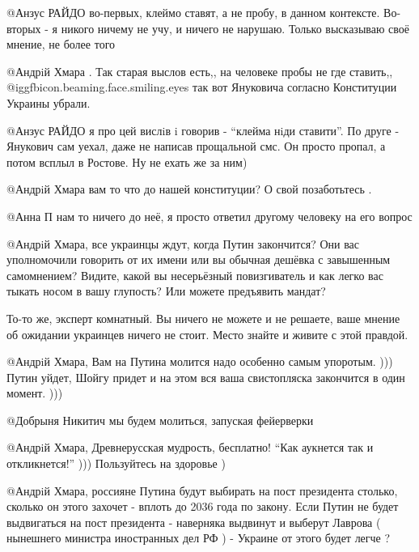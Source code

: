 \begin{itemize}
\begin{itemize}

@Анзус РАЙДО  во-первых, клеймо ставят, а не пробу, в данном контексте.
Во-вторых - я никого ничему не учу, и ничего не нарушаю. Только высказываю
своё мнение, не более того


@Андрiй Хмара . Так старая выслов есть,, на человеке пробы не где ставить,,  @igg{fbicon.beaming.face.smiling.eyes} 
так вот Януковича согласно Конституции Украины убрали.


@Анзус РАЙДО  я про цей вислiв i говорив - \enquote{клейма нiди ставити}. По друге -
Янукович сам уехал, даже не написав прощальной смс. Он просто пропал, а потом
всплыл в Ростове. Ну не ехать же за ним)


@Андрiй Хмара  вам то  что до нашей конституции? О свой позаботьтесь .



@Анна П  нам то ничего до неё, я просто ответил другому человеку на его вопрос


@Андрiй Хмара, все украинцы ждут, когда Путин закончится? Они вас
уполномочили говорить от их имени или вы обычная дешёвка с завышенным
самомнением? Видите, какой вы несерьёзный повизгиватель и как легко вас тыкать
носом в вашу глупость? Или можете предъявить мандат? 

То-то же, эксперт комнатный. Вы ничего не можете и не решаете, ваше мнение об
ожидании украинцев ничего не стоит. Место знайте и живите с этой правдой.


@Андрiй Хмара, Вам на Путина молится надо особенно самым упоротым. ))) Путин
уйдет, Шойгу придет и на этом вся ваша свистопляска закончится в один момент.
)))


@Добрыня Никитич  мы будем молиться, запуская фейерверки


@Андрiй Хмара, Древнерусская мудрость, бесплатно! \enquote{Как аукнется так и
откликнется!} ))) Пользуйтесь на здоровье )


@Андрiй Хмара, россияне Путина будут выбирать на пост президента столько,
сколько он этого захочет - вплоть до 2036 года по закону. Если Путин не будет
выдвигаться на пост президента - наверняка выдвинут и выберут Лаврова (
нынешнего министра иностранных дел РФ ) - Украине от этого будет легче ?


\end{itemize}
\end{itemize}
